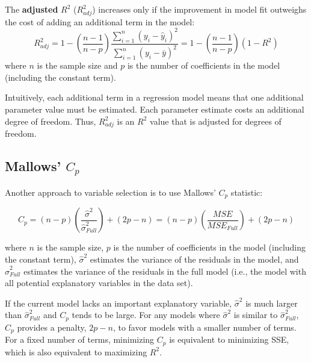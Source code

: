 \documentclass[
]{report}
\begin{document}
The \textbf{adjusted} \(\scriptstyle {R}^2\) (\(\scriptstyle R^2_{adj}\)) increases only if the improvement in model fit outweighs the cost of adding an additional term in the model:
\begin{equation}
R^2_{adj} = 1 - \left(\frac{n - 1}{n - p}\right)\frac{\sum_{i=1}^n (y_i - \hat{y}_i)^2}{\sum_{i=1}^n (y_i - \bar{y})^2}
= 1 - \left(\frac{n - 1}{n - p}\right)(1 - R^2)
\tag{3.13}
\end{equation}
where \(\scriptstyle n\) is the sample size and \(\scriptstyle p\) is the number of coefficients in the model (including the constant term).

Intuitively, each additional term in a regression model means that one additional parameter value must be estimated. Each parameter estimate costs an additional degree of freedom. Thus, \(\scriptstyle R^2_{adj}\) is an \(\scriptstyle {R}^2\) value that is adjusted for degrees of freedom.

\hypertarget{mallows-scriptstyle-c_p}{%
\subsection*{\texorpdfstring{Mallows' \(\scriptstyle C_p\)}{Mallows' \textbackslash scriptstyle C\_p}}\label{mallows-scriptstyle-c_p}}

Another approach to variable selection is to use Mallows' \(\scriptstyle C_p\) statistic:

\begin{equation}
C_p = (n - p)\left(\frac{\hat{\sigma}^2}{\hat{\sigma}^2_{Full}}\right) + (2p - n)
= (n - p)\left(\frac{MSE}{MSE_{Full}}\right) + (2p - n)
\tag{3.14}
\end{equation}

where \(\scriptstyle n\) is the sample size, \(\scriptstyle p\) is the number of coefficients in the model (including the constant term), \(\scriptstyle \hat{\sigma}^2\) estimates the variance of the residuals in the model, and \(\scriptstyle \hat{\sigma}^2_{Full}\) estimates the variance of the residuals in the full model (i.e., the model with all potential explanatory variables in the data set).

If the current model lacks an important explanatory variable, \(\scriptstyle \hat{\sigma}^2\) is much larger than \(\scriptstyle \hat{\sigma}^2_{Full}\) and \(\scriptstyle C_p\) tends to be large. For any models where \(\scriptstyle \hat{\sigma}^2\) is similar to \(\scriptstyle \hat{\sigma}^2_{Full}\), \(\scriptstyle C_p\) provides a penalty, \(\scriptstyle 2p - n\), to favor models with a smaller number of terms. For a fixed number of terms, minimizing \(\scriptstyle C_p\) is equivalent to minimizing SSE, which is also equivalent to maximizing \(\scriptstyle {R}^2\).
\end{document}
